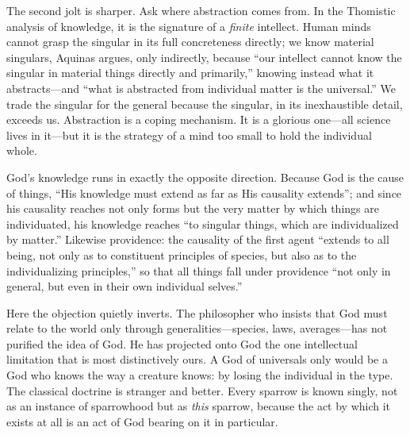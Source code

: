 The second jolt is sharper. Ask where abstraction comes from. In the Thomistic analysis of knowledge, it is the signature of a \emph{finite} intellect. Human minds cannot grasp the singular in its full concreteness directly; we know material singulars, Aquinas argues, only indirectly, because ``our intellect cannot know the singular in material things directly and primarily,'' knowing instead what it abstracts---and ``what is abstracted from individual matter is the universal.'' We trade the singular for the general because the singular, in its inexhaustible detail, exceeds us. Abstraction is a coping mechanism. It is a glorious one---all science lives in it---but it is the strategy of a mind too small to hold the individual whole.

God's knowledge runs in exactly the opposite direction. Because God is the cause of things, ``His knowledge must extend as far as His causality extends''; and since his causality reaches not only forms but the very matter by which things are individuated, his knowledge reaches ``to singular things, which are individualized by matter.'' Likewise providence: the causality of the first agent ``extends to all being, not only as to constituent principles of species, but also as to the individualizing principles,'' so that all things fall under providence ``not only in general, but even in their own individual selves.''

Here the objection quietly inverts. The philosopher who insists that God must relate to the world only through generalities---species, laws, averages---has not purified the idea of God. He has projected onto God the one intellectual limitation that is most distinctively ours. A God of universals only would be a God who knows the way a creature knows: by losing the individual in the type. The classical doctrine is stranger and better. Every sparrow is known singly, not as an instance of sparrowhood but as \emph{this} sparrow, because the act by which it exists at all is an act of God bearing on it in particular.

